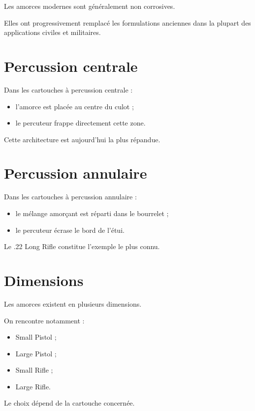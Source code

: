 Les amorces modernes sont généralement non corrosives.

Elles ont progressivement remplacé les formulations anciennes dans la
plupart des applications civiles et militaires.

\section{Percussion centrale}

Dans les cartouches à percussion centrale :

\begin{itemize}
    \item l'amorce est placée au centre du culot ;
    \item le percuteur frappe directement cette zone.
\end{itemize}

Cette architecture est aujourd'hui la plus répandue.

\section{Percussion annulaire}

Dans les cartouches à percussion annulaire :

\begin{itemize}
    \item le mélange amorçant est réparti dans le bourrelet ;
    \item le percuteur écrase le bord de l'étui.
\end{itemize}

Le .22 Long Rifle constitue l'exemple le plus connu.

\section{Dimensions}

Les amorces existent en plusieurs dimensions.

On rencontre notamment :

\begin{itemize}
    \item Small Pistol ;
    \item Large Pistol ;
    \item Small Rifle ;
    \item Large Rifle.
\end{itemize}

Le choix dépend de la cartouche concernée.

